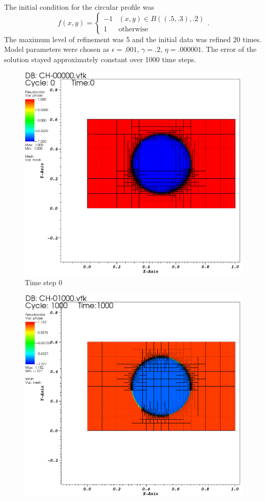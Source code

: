 \documentclass[9pt]{beamer}
\newcommand{\eps}{\epsilon}
\begin{document}
\begin{frame}
The initial condition for the circular profile was
$$
f(x, y) = \begin{cases}
-1 & (x,y)\in B((.5, .3), .2)\\
1 & \text{otherwise}
\end{cases}.
$$
The maximum level of refinement was 5 and the initial data was refined 20 times. Model parameters were chosen as $\eps = .001$, $\gamma = .2$, $\eta = .000001$. The error of the solution stayed approximately constant over 1000 time steps.
\begin{minipage}{.4\paperwidth}
	\begin{figure}[!b]
		\centering
		\includegraphics[scale=.6]{CHBall1.png}
		\caption*{Time step 0}
	\end{figure}
\end{minipage}%
\begin{minipage}{.4\paperwidth}
	\begin{figure}[!b]
		\centering
		\includegraphics[scale=.6]{CHBall2.png}

\end{figure}
\end{minipage}
\end{frame}
\end{document}
